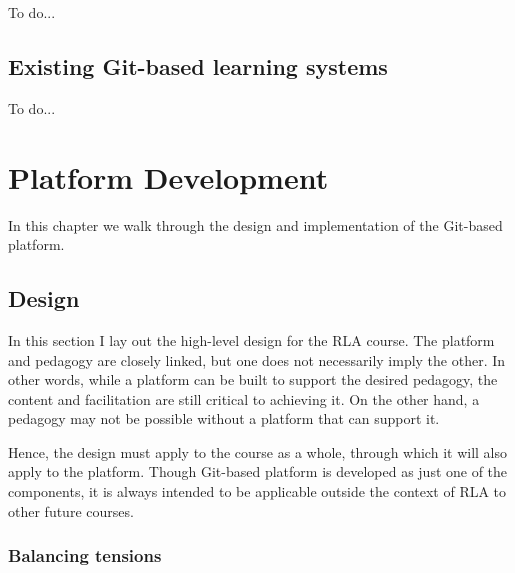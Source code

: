 \documentclass[12pt,twoside,vi]{mitthesis}
\newcommand{\wip}[1]{{\color{red} To do...}}
\begin{document}
\wip{While Git was initially created for and has been largely relied on by the software development community, its use has spread to other knowledge workers.

An example of applying Git to a traditional use case is cookbooks: a service called Fork the Cookbook exists in which users can fork, or copy, an existing recipe and tweak it to make it their own. This creates a collaborative and decentralized platform for sharing cooking recipes.~\cite{forkthecookbook}

Example applications include recipes, legislation, datasets, general CMS, etc.}

\section{Existing Git-based learning systems}

\wip{look through references}

\chapter{Platform Development}

In this chapter we walk through the design and implementation of the Git-based platform. 

\section{Design}

In this section I lay out the high-level design for the RLA course. The platform and pedagogy are closely linked, but one does not necessarily imply the other. In other words, while a platform can be built to support the desired pedagogy, the content and facilitation are still critical to achieving it. On the other hand, a pedagogy may not be possible without a platform that can support it. 

Hence, the design must apply to the course as a whole, through which it will also apply to the platform. Though Git-based platform is developed as just one of the components, it is always intended to be applicable outside the context of RLA to other future courses.

\subsection{Balancing tensions}
\end{document}
